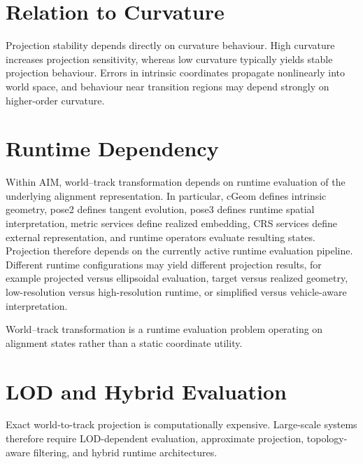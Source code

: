 \section{Relation to Curvature}

Projection stability depends directly on curvature behaviour. High
curvature increases projection sensitivity, whereas low curvature
typically yields stable projection behaviour. Errors in intrinsic
coordinates propagate nonlinearly into world space, and behaviour near
transition regions may depend strongly on higher-order curvature.

\section{Runtime Dependency}

Within AIM, world--track transformation depends on runtime evaluation of
the underlying alignment representation. In particular, cGeom defines
intrinsic geometry, pose2 defines tangent evolution, pose3 defines
runtime spatial interpretation, metric services define realized
embedding, CRS services define external representation, and runtime
operators evaluate resulting states. Projection therefore depends on the
currently active runtime evaluation pipeline. Different runtime
configurations may yield different projection results, for example
projected versus ellipsoidal evaluation, target versus realized
geometry, low-resolution versus high-resolution runtime, or simplified
versus vehicle-aware interpretation.

\begin{principle}
\label{princ:runtime-projection}
World--track transformation is a runtime evaluation problem operating on
alignment states rather than a static coordinate utility.
\end{principle}

\section{LOD and Hybrid Evaluation}

Exact world-to-track projection is computationally expensive. Large-scale
systems therefore require LOD-dependent evaluation, approximate
projection, topology-aware filtering, and hybrid runtime architectures.

